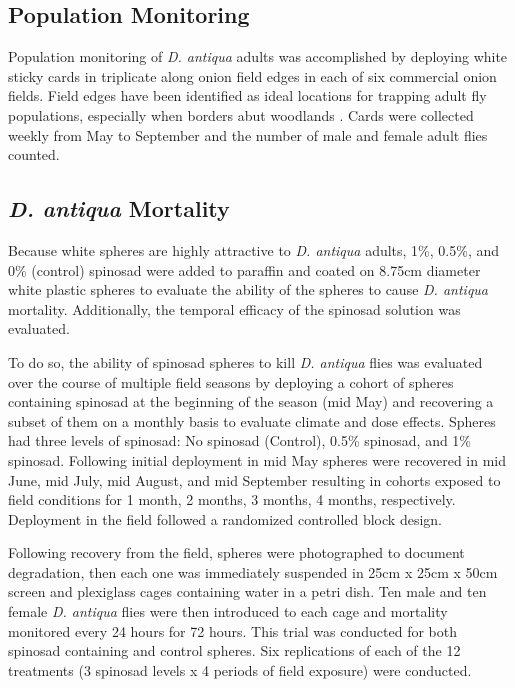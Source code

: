 \documentclass[alpha-refs]{wiley-article}
\begin{document}
\subsection{Population Monitoring}

Population monitoring of \textit{D. antiqua} adults was accomplished by deploying white sticky cards in triplicate along onion field edges in each of six commercial onion fields.  Field edges have been identified as ideal locations for trapping adult fly populations, especially when borders abut woodlands \citep{werling2006spatial}.  Cards were collected weekly from May to September and the number of male and female adult flies counted.

\subsection{\textit{D. antiqua} Mortality}

Because white spheres are highly attractive to \textit{D. antiqua} adults, 1\%, 0.5\%, and 0\% (control) spinosad were added to paraffin and coated on 8.75cm diameter white plastic spheres to evaluate the ability of the spheres to cause \textit{D. antiqua} mortality. Additionally, the temporal efficacy of the spinosad solution was evaluated.

To do so, the ability of spinosad spheres to kill \textit{D. antiqua} flies was evaluated over the course of multiple field seasons by deploying a cohort of spheres containing spinosad at the beginning of the season (mid May) and recovering a subset of them on a monthly basis to evaluate climate and dose effects. Spheres had three levels of spinosad: No spinosad (Control), 0.5\% spinosad, and 1\% spinosad. Following initial deployment in mid May spheres were recovered in mid June, mid July, mid August, and mid September resulting in cohorts exposed to field conditions for 1 month, 2 months, 3 months, 4 months, respectively. Deployment in the field followed a randomized controlled block design.

Following recovery from the field, spheres were photographed to document degradation, then each one was immediately suspended in 25cm x 25cm x 50cm screen and plexiglass cages containing water in a petri dish. Ten male and ten female \textit{D. antiqua} flies were then introduced to each cage and mortality monitored every 24 hours for 72 hours. This trial was conducted for both spinosad containing and control spheres. Six replications of each of the 12 treatments (3 spinosad levels x 4 periods of field exposure) were conducted.
 
\end{document}
